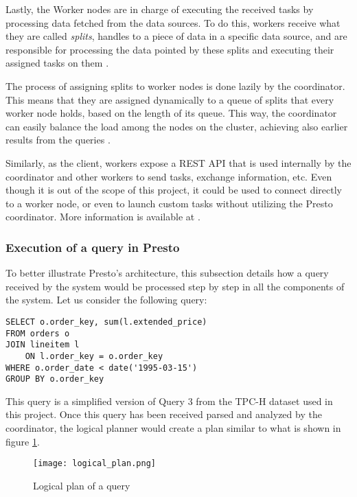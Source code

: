 \documentclass[conference]{IEEEtran}
\begin{document}
Lastly, the Worker nodes are in charge of executing the received tasks by processing data fetched from the data sources. To do this, workers receive what they are called \textit{splits}, handles to a piece of data in a specific data source, and are responsible for processing the data pointed by these splits and executing their assigned tasks on them \cite{sethi-2019}.

The process of assigning splits to worker nodes is done lazily by the coordinator. This means that they are assigned dynamically to a queue of splits that every worker node holds, based on the length of its queue. This way, the coordinator can easily balance the load among the nodes on the cluster, achieving also earlier results from the queries \cite{sethi-2019}.

Similarly, as the client, workers expose a REST API that is used internally by the coordinator and other workers to send tasks, exchange information, etc. Even though it is out of the scope of this project, it could be used to connect directly to a worker node, or even to launch custom tasks without utilizing the Presto coordinator. More information is available at \cite{the-presto-foundation-no-date}.

\subsubsection{Execution of a query in Presto}
To better illustrate Presto's architecture, this subsection details how a query received by the system would be processed step by step in all the components of the system. Let us consider the following query:

\begin{lstlisting}
SELECT o.order_key, sum(l.extended_price)
FROM orders o
JOIN lineitem l
    ON l.order_key = o.order_key
WHERE o.order_date < date('1995-03-15')
GROUP BY o.order_key
\end{lstlisting}

\vspace{1mm}
This query is a simplified version of Query 3 from the TPC-H dataset used in this project. Once this query has been received parsed and analyzed by the coordinator, the logical planner would create a plan similar to what is shown in figure \ref{logical_plan}.

\begin{figure}[htbp]
\centerline{\texttt{[image: logical\_plan.png]}}
\caption{Logical plan of a query \cite{sethi-2019}}
\label{logical_plan}
\end{figure}
\end{document}
